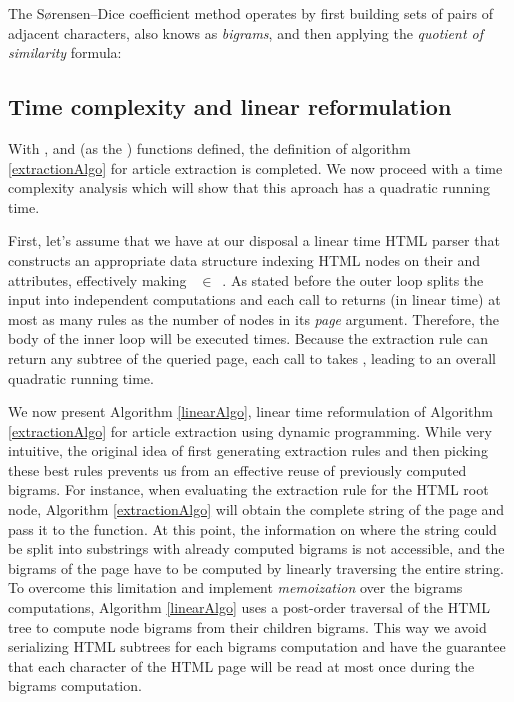 \similarityTable

The Sørensen–Dice coefficient method operates by first building sets of pairs of adjacent characters, also knows as \emph{bigrams}, and then applying the \emph{quotient of similarity} formula:

\similarityAlgo


\subsection{Time complexity and linear reformulation}
\label{timecomplexityandlinearreformulation}

With ,  and  (as the ) functions defined, the definition of algorithm \ref{extractionAlgo} for article extraction is completed. We now proceed with a time complexity analysis which will show that this aproach has a quadratic running time.

First, let's assume that we have at our disposal a linear time HTML parser that constructs an appropriate data structure indexing HTML nodes on their  and  attributes, effectively making ~$\in$~. As stated before the outer loop splits the input into independent computations and each call to  returns (in linear time) at most as many rules as the number of nodes in its \emph{page} argument. Therefore, the body of the inner loop will be executed  times. Because the extraction rule can return any subtree of the queried page, each call to  takes , leading to an overall quadratic running time.

We now present Algorithm \ref{linearAlgo}, linear time reformulation of Algorithm \ref{extractionAlgo} for article extraction using dynamic programming. While very intuitive, the original idea of first generating extraction rules and then picking these best rules prevents us from an effective reuse of previously computed bigrams. For instance, when evaluating the extraction rule for the HTML root node, Algorithm \ref{extractionAlgo} will obtain the complete string of the page and pass it to the  function. At this point, the information on where the string could be split into substrings with already computed bigrams is not accessible, and the bigrams of the page have to be computed by linearly traversing the entire string. To overcome this limitation and implement \emph{memoization} over the bigrams computations, Algorithm \ref{linearAlgo} uses a post-order traversal of the HTML tree to compute node bigrams from their children bigrams. This way we avoid serializing HTML subtrees for each bigrams computation and have the guarantee that each character of the HTML page will be read at most once during the bigrams computation.

